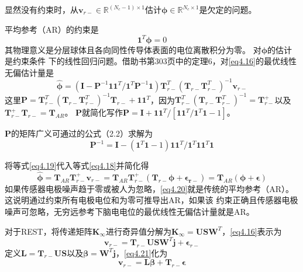 显然没有约束时，从$\mathbf{v}_{r-}\in\mathbb{R}^{(N_c-1)\times1}$估计$\mathbf{\phi}\in\mathbb{R}^{N_c\times1}$是欠定的问题。

平均参考（AR）的约束是
\begin{equation}\label{eq4.17}
\mathbf{1}^T\mathbf{\phi}=0
\end{equation}
其物理意义是分层球体且各向同性传导体表面的电位离散积分为零。 对$\mathbf{\phi}$的估计是约束条件
下的线性回归问题。借助书\cite{magnus_matrix_2007}第303页中的定理6，对\eqref{eq4.16}的最优线性无偏估计量是
\begin{equation}\label{eq4.18}
\hat{\mathbf{\phi}}=(\mathbf{I}-\mathbf{P}^{-1}\mathbf{11}^T/{\mathbf{1}^T\mathbf{P}^{-1}\mathbf{1}})\mathbf{T}_{r-}^T(\mathbf{T}_{r-}\mathbf{T}_{r-}^T)^{-1}\mathbf{v}_{r-}
\end{equation}
这里$\mathbf{P}={\mathbf{T}_{r-}^T(\mathbf{T}_{r-}\mathbf{T}_{r-}^T)^{-1}\mathbf{T}_{r-}}+\mathbf{11}^T$，因为$\mathbf{T}_{r-}^T(\mathbf{T}_{r-}\mathbf{T}_{r-}^T)^{-1}=\mathbf{T}_{r-}^+$以及$\mathbf{T}_{r-}^+\mathbf{T}_{r-}=\mathbf{T}_{AR}$。 $\mathbf{P}$就简化写作$\mathbf{P}=\mathbf{I}+\mathbf{11}^T/{[\mathbf{11}^T/{\mathbf{1}^T\mathbf{1}-1}]}$。

$\mathbf{P}$的矩阵广义可通过\cite{baksalary_revisitation_2003}的公式（2.2）求解为
\begin{equation}\label{eq4.19}
\mathbf{P}^{-1}=\mathbf{I}-(\mathbf{1}^T\mathbf{1}-1)\mathbf{11}^T/{\mathbf{1}^T\mathbf{11}^T\mathbf{1}}
\end{equation}

将等式\eqref{eq4.19}代入等式\eqref{eq4.18}并简化得
\begin{equation}\label{eq4.20}
\hat{\mathbf{\phi}}=\mathbf{T}_{AR}\mathbf{T}_{r-}^+\mathbf{v}_{r-}=\mathbf{T}_{AR}\mathbf{T}_{r-}^+(\mathbf{T}_{r-}\mathbf{\phi}+\mathbf{\epsilon_{r-}})=\mathbf{T}_{AR}(\mathbf{\phi}+\mathbf{\epsilon})
\end{equation}
如果传感器电极噪声趋于零或被人为忽略，\eqref{eq4.20}就是传统的平均参考（AR）。 这说明通过约束所有电极电位和为零可推导出AR，如果该
约束正确且传感器电极噪声可忽略，无穷远参考下脑电电位的最优线性无偏估计量就是AR。

对于REST，将传递矩阵$\mathbf{K}_{\infty}$进行奇异值分解为$\mathbf{K}_{\infty}=\mathbf{USW}^T$，\eqref{eq4.16}表示为
\begin{equation}\label{eq4.21}
\mathbf{v}_{r-}=\mathbf{T}_{r-}\mathbf{USW}^T\mathbf{j}+\mathbf{\epsilon}_{r-}
\end{equation}
定义$\mathbf{L}=\mathbf{T}_{r-}\mathbf{US}$以及$\mathbf{\beta}=\mathbf{W}^T\mathbf{j}$，\eqref{eq4.21}化为
\begin{equation}\label{eq4.22}
\mathbf{v}_{r-}=\mathbf{L\beta}+\mathbf{T}_{r-}\mathbf{\epsilon}
\end{equation}


